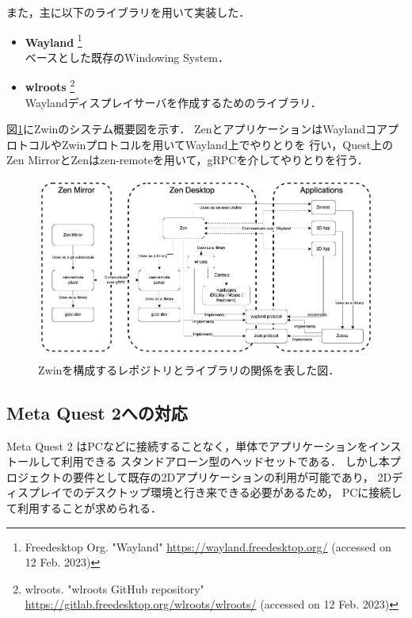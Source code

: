 また，主に以下のライブラリを用いて実装した．

\begin{itemize}
  \item \textbf{Wayland}
        \footnote{Freedesktop Org. "Wayland" \url{https://wayland.freedesktop.org/} (accessed on 12 Feb. 2023)} \\
        ベースとした既存のWindowing System．
  \item \textbf{wlroots}
        \footnote{wlroots. "wlroots GitHub repository" \url{https://gitlab.freedesktop.org/wlroots/wlroots/} (accessed on 12 Feb. 2023)} \\
        Waylandディスプレイサーバを作成するためのライブラリ．
\end{itemize}

図\ref{fig:overview}にZwinのシステム概要図を示す．
ZenとアプリケーションはWaylandコアプロトコルやZwinプロトコルを用いてWayland上でやりとりを
行い，Quest上のZen MirrorとZenはzen-remoteを用いて，gRPCを介してやりとりを行う．

\begin{figure}[htbp]
  \centering
  \includegraphics[keepaspectratio, width=\linewidth]{fig/development/overview.png}
  \caption{Zwinを構成するレポジトリとライブラリの関係を表した図．}
  \label{fig:overview}
\end{figure}

\subsection{Meta Quest 2への対応}

Meta Quest 2 はPCなどに接続することなく，単体でアプリケーションをインストールして利用できる
スタンドアローン型のヘッドセットである．
しかし本プロジェクトの要件として既存の2Dアプリケーションの利用が可能であり，
2Dディスプレイでのデスクトップ環境と行き来できる必要があるため，
PCに接続して利用することが求められる．

